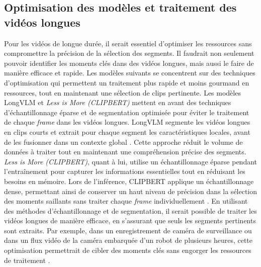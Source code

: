 \subsection{Optimisation des modèles et traitement des vidéos longues}
Pour les vidéos de longue durée, il serait essentiel d’optimiser les ressources sans compromettre la précision de la sélection des segments. Il faudrait non seulement pouvoir identifier les moments clés dans des vidéos longues, mais aussi le faire de manière efficace et rapide. Les modèles suivants se concentrent sur des techniques d’optimisation qui permettent un traitement plus rapide et moins gourmand en ressources, tout en maintenant une sélection de clips pertinente. Les modèles LongVLM \cite{weng2024} et \textit{Less is More (CLIPBERT)} \cite{lei2021_clipbert} mettent en avant des techniques d’échantillonnage éparse et de segmentation optimisée pour éviter le traitement de chaque \textit{frame} dans les vidéos longues. LongVLM segmente les vidéos longues en clips courts et extrait pour chaque segment les caractéristiques locales, avant de les fusionner dans un contexte global \cite{weng2024}. Cette approche réduit le volume de données à traiter tout en maintenant une compréhension précise des segments. \textit{Less is More (CLIPBERT)}, quant à lui, utilise un échantillonnage éparse pendant l’entraînement pour capturer les informations essentielles tout en réduisant les besoins en mémoire. Lors de l’inférence, CLIPBERT applique un échantillonnage dense, permettant ainsi de conserver un haut niveau de précision dans la sélection des moments saillants sans traiter chaque \textit{frame} individuellement \cite{lei2021_clipbert}. En utilisant des méthodes d’échantillonnage et de segmentation, il serait possible de traiter les vidéos longues de manière efficace, en s’assurant que seuls les segments pertinents sont extraits. Par exemple, dans un enregistrement de caméra de surveillance ou dans un flux vidéo de la caméra embarquée d’un robot de plusieurs heures, cette optimisation permettrait de cibler des moments clés sans engorger les ressources de traitement \cite{weng2024}\cite{lei2021_clipbert}.

